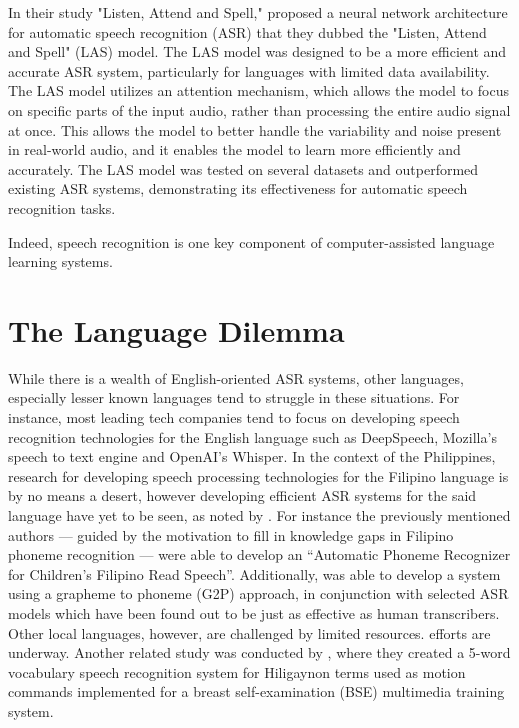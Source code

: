 In their study "Listen, Attend and Spell," \citeauthor{chan-2015} \citeyear{chan-2015} proposed a neural network architecture for automatic speech recognition (ASR) that they dubbed the "Listen, Attend and Spell" (LAS) model. The LAS model was designed to be a more efficient and accurate ASR system, particularly for languages with limited data availability. The LAS model utilizes an attention mechanism, which allows the model to focus on specific parts of the input audio, rather than processing the entire audio signal at once. This allows the model to better handle the variability and noise present in real-world audio, and it enables the model to learn more efficiently and accurately. The LAS model was tested on several datasets and outperformed existing ASR systems, demonstrating its effectiveness for automatic speech recognition tasks.

Indeed, speech recognition is one key component of computer-assisted language learning systems.


\section{The Language Dilemma}
While there is a wealth of English-oriented ASR systems, other languages, especially lesser known languages tend to struggle in these situations. For instance, most leading tech companies tend to focus on developing speech recognition technologies for the English language such as DeepSpeech, Mozilla’s speech to text engine and OpenAI’s Whisper. In the context of the Philippines, research for developing speech processing technologies for the Filipino language is by no means a desert, however developing efficient ASR systems for the said language have yet to be seen, as noted by \citeauthor{dimzon-2020} \citeyear{dimzon-2020} . For instance the previously mentioned authors — guided by the motivation to fill in knowledge gaps in Filipino phoneme recognition — were able to develop an “Automatic Phoneme Recognizer for Children’s Filipino Read Speech”. Additionally, \citeauthor{aquino-2019} \citeyear{aquino-2019} was able to develop a system using a grapheme to phoneme (G2P) approach, in conjunction with selected ASR models which have been found out to be just as effective as human transcribers. Other local languages, however, are challenged by limited resources. efforts are underway. Another related study was conducted by \citeauthor{billones-2014} \citeyear{billones-2014} , where they created a 5-word vocabulary speech recognition system for Hiligaynon terms used as motion commands implemented for a breast self-examination (BSE) multimedia training system.

